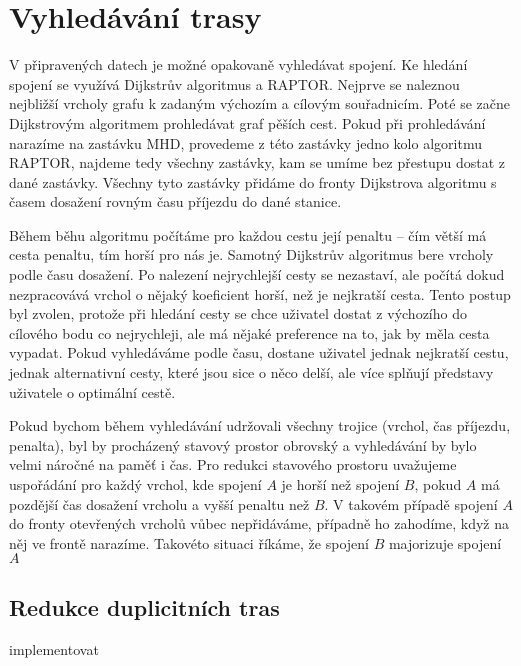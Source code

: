 \chapter{Vyhledávání trasy}
V připravených datech je možné opakovaně vyhledávat spojení. Ke hledání spojení
se využívá Dijkstrův algoritmus a RAPTOR. Nejprve se naleznou nejbližší vrcholy
grafu k zadaným výchozím a cílovým souřadnicím. Poté se začne Dijkstrovým
algoritmem prohledávat graf pěších cest. Pokud při prohledávání narazíme na
zastávku MHD, provedeme z této zastávky jedno kolo algoritmu RAPTOR, najdeme
tedy všechny zastávky, kam se umíme bez přestupu dostat z dané zastávky. Všechny
tyto zastávky přidáme do fronty Dijkstrova algoritmu s časem dosažení rovným
času příjezdu do dané stanice. 

Během běhu algoritmu počítáme pro každou cestu její penaltu -- čím větší má
cesta penaltu, tím horší pro nás je. Samotný Dijkstrův algoritmus bere vrcholy
podle času dosažení. Po nalezení nejrychlejší cesty se nezastaví, ale počítá
dokud nezpracovává vrchol o nějaký koeficient horší, než je nejkratší cesta. 
Tento postup byl zvolen, protože při hledání cesty se chce uživatel dostat z výchozího
do cílového bodu co nejrychleji, ale má nějaké preference na to, jak by měla
cesta vypadat. Pokud vyhledáváme podle času, dostane uživatel jednak nejkratší
cestu, jednak alternativní cesty, které jsou sice o něco delší, ale více splňují
představy uživatele o optimální cestě.

Pokud bychom během vyhledávání udržovali všechny trojice (vrchol, čas příjezdu,
penalta), byl by procházený stavový prostor obrovský a vyhledávání by bylo velmi
náročné na paměť i čas. Pro redukci stavového prostoru uvažujeme uspořádání pro
každý vrchol, kde spojení $A$ je horší než spojení $B$, pokud $A$ má pozdější
čas dosažení vrcholu a vyšší penaltu než $B$. V takovém případě spojení $A$ do
fronty otevřených vrcholů vůbec nepřidáváme, případně ho zahodíme, když na něj
ve frontě narazíme. Takovéto situaci říkáme, že spojení $B$ majorizuje spojení
$A$

\section{Redukce duplicitních tras}
\TODO implementovat

